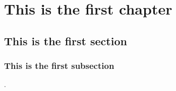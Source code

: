 \chapter{This is the first chapter}
\lipsum
\section{This is the first section}
\lipsum
\subsection{This is the first subsection}
\lipsum \cite{lovecraft2016el}.

